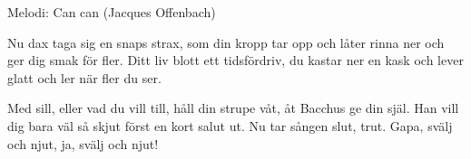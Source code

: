 \begin{song}

\begin{songmeta}
Melodi: Can can (Jacques Offenbach)
\end{songmeta}

\begin{songtext}
Nu dax
taga sig en snaps strax,
som din kropp tar opp och
låter rinna ner och ger dig smak för fler.
Ditt liv
blott ett tidsfördriv, du
kastar ner en kask och
lever glatt och ler
när fler du ser.

Med sill,
eller vad du vill till,
håll din strupe våt, åt
Bacchus ge din själ. Han vill dig bara väl
så skjut
först en kort salut ut.
Nu tar sången slut, trut.
Gapa, svälj och njut,
ja, svälj och njut!
\end{songtext}

\end{song}

